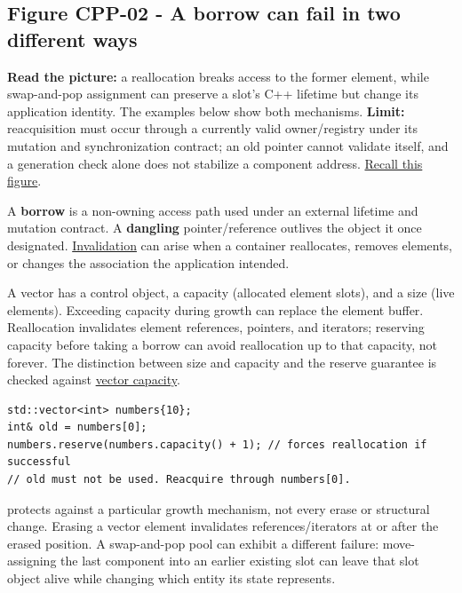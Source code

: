 \hypertarget{01-foundations-i-ch003-when-a-valid-borrow-stops-naming-the-intended-thing}{}

\subsection{Figure CPP-02 - A borrow can fail in two different ways}\label{01-foundations-i-ch003-figure-cpp-02---a-borrow-can-fail-in-two-different-ways}

\hypertarget{01-foundations-i-ch003-figure-cpp-02---a-borrow-can-fail-in-two-different-ways}{}


\textbf{Read the picture:} a reallocation breaks access to the former element, while swap-and-pop assignment can preserve a slot's C++ lifetime but change its application identity. The examples below show both mechanisms. \textbf{Limit:} reacquisition must occur through a currently valid owner/registry under its mutation and synchronization contract; an old pointer cannot validate itself, and a generation check alone does not stabilize a component address. \hyperref[appendix-960160274237-four-figure-briefs]{Recall this figure}.

A \textbf{borrow} is a non-owning access path used under an external lifetime and mutation contract. A \textbf{dangling} pointer/reference outlives the object it once designated. \hyperref[appendix-f9b8b9188c7f]{Invalidation} can arise when a container reallocates, removes elements, or changes the association the application intended.

A vector has a control object, a capacity (allocated element slots), and a size (live elements). Exceeding capacity during growth can replace the element buffer. Reallocation invalidates element references, pointers, and iterators; reserving capacity before taking a borrow can avoid reallocation up to that capacity, not forever. The distinction between size and capacity and the reserve guarantee is checked against \href{https://eel.is/c++draft/vector.capacity}{vector capacity}.

\begin{verbatim}
std::vector<int> numbers{10};
int& old = numbers[0];
numbers.reserve(numbers.capacity() + 1); // forces reallocation if successful
// old must not be used. Reacquire through numbers[0].
\end{verbatim}

 protects against a particular growth mechanism, not every erase or structural change. Erasing a vector element invalidates references/iterators at or after the erased position. A swap-and-pop pool can exhibit a different failure: move-assigning the last component into an earlier existing slot can leave that slot object alive while changing which entity its state represents.

